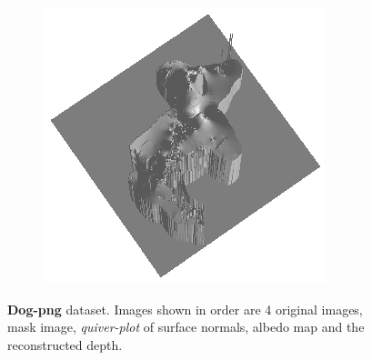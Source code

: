 \documentclass[11pt]{article}
\begin{document}
\begin{figure}[!hbt]
\begin{subfigure}[h]{0.5\textwidth}
    \includegraphics[width = \textwidth]{../dog-png/depthMap.png}
  \end{subfigure} 
   
  \caption{\textbf{Dog-png} dataset. Images shown in order are 4 original images, mask image, \emph{quiver-plot} of surface normals, albedo map and the reconstructed depth.}
  \label{fig6}
  \end{figure}
\end{document}
